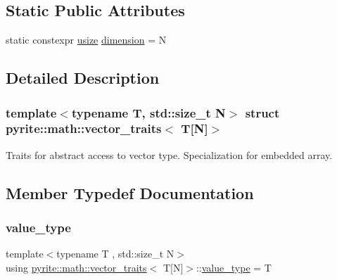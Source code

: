 \subsection*{Static Public Attributes}
\begin{DoxyCompactItemize}
\item 
static constexpr \mbox{\hyperlink{type_8hpp_a3984e6dc0a53b867e054e8447f2f2be1}{usize}} \mbox{\hyperlink{structpyrite_1_1math_1_1vector__traits_3_01_t[_n]_4_a7afc072ea1bfd989f6b383a1a6cb788b}{dimension}} = N
\end{DoxyCompactItemize}


\subsection{Detailed Description}
\subsubsection*{template$<$typename T, std\+::size\+\_\+t N$>$\newline
struct pyrite\+::math\+::vector\+\_\+traits$<$ T\mbox{[}\+N\mbox{]}$>$}

Traits for abstract access to vector type. Specialization for embedded array. 

\subsection{Member Typedef Documentation}
\mbox{\label{structpyrite_1_1math_1_1vector__traits_3_01_t[_n]_4_ab6b98499d39e4fb65ea3addf98fd7960}} 
\subsubsection{\texorpdfstring{value\+\_\+type}{value\_type}}
{\footnotesize\ttfamily template$<$typename T , std\+::size\+\_\+t N$>$ \\
using \mbox{\hyperlink{structpyrite_1_1math_1_1vector__traits}{pyrite\+::math\+::vector\+\_\+traits}}$<$ T\mbox{[}N\mbox{]}$>$\+::\mbox{\hyperlink{structpyrite_1_1math_1_1vector__traits_3_01_t[_n]_4_ab6b98499d39e4fb65ea3addf98fd7960}{value\+\_\+type}} =  T}

